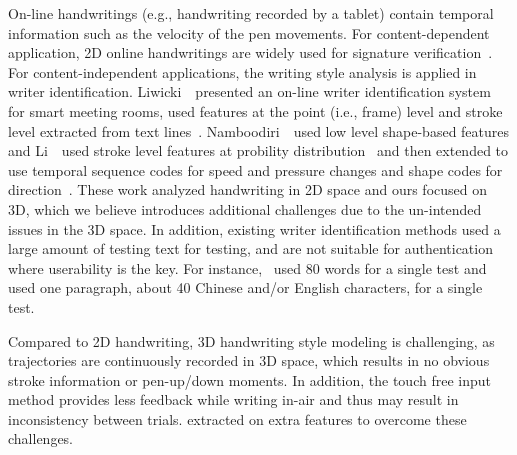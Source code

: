 On-line handwritings (e.g., handwriting recorded by a tablet) contain temporal information such as the velocity of the pen movements. For content-dependent application, 2D online handwritings are widely used for signature verification~\cite{Guru:PAM09}. For content-independent applications, the writing style analysis is applied in writer identification. Liwicki~\etal ~presented an on-line writer identification system for smart meeting rooms, used features at the point (i.e., frame) level and stroke level extracted from text lines~\cite{Liwicki2006:onlineSmartMeeting}.
Namboodiri~\etal ~used low level shape-based features and Li~\etal ~used stroke level features at probility distribution~\cite{Li2007:StrokeProbabilityDistribution} and then extended to use temporal sequence codes for speed and pressure changes and shape codes for direction~\cite{conf/icdar/LiT09}. These work analyzed handwriting in 2D space and ours focused on 3D, which we believe introduces additional challenges due to the un-intended issues in the 3D space. In addition, existing writer identification methods used a large amount of testing text for testing, and are not suitable for authentication where userability is the key. For instance,~\cite{Liwicki2006:onlineSmartMeeting} used 80 words for a single test and~\cite{conf/icdar/LiT09} used one paragraph, about 40 Chinese and/or English characters, for a single test.
  
Compared to 2D handwriting, 3D handwriting style modeling is challenging, as trajectories are continuously recorded in 3D space, which results in no obvious stroke information or pen-up/down moments. In addition, the touch free input method provides less feedback while writing in-air and thus may result in inconsistency between trials. \CiT extracted on extra features to overcome these challenges.




